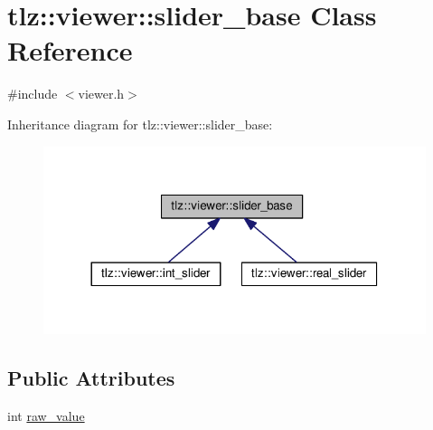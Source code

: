 \hypertarget{classtlz_1_1viewer_1_1slider__base}{}\section{tlz\+:\+:viewer\+:\+:slider\+\_\+base Class Reference}
\label{classtlz_1_1viewer_1_1slider__base}


{\ttfamily \#include $<$viewer.\+h$>$}



Inheritance diagram for tlz\+:\+:viewer\+:\+:slider\+\_\+base\+:
\nopagebreak
\begin{figure}[H]
\begin{center}
\leavevmode
\includegraphics[width=317pt]{classtlz_1_1viewer_1_1slider__base__inherit__graph}
\end{center}
\end{figure}
\subsection*{Public Attributes}
\begin{DoxyCompactItemize}
\item 
int \hyperlink{classtlz_1_1viewer_1_1slider__base_a4146a1545ccb324f95bb5f8108ffabb1}{raw\+\_\+value}
\end{DoxyCompactItemize}
